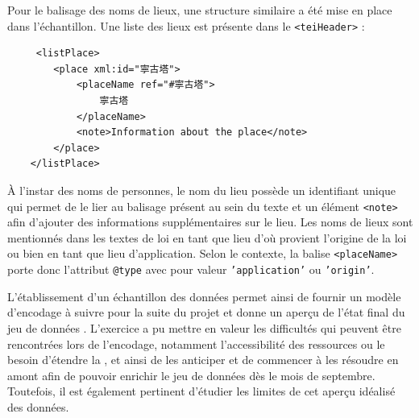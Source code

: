 Pour le balisage des noms de lieux, une structure similaire a été mise en place dans l'échantillon. Une liste des lieux est présente dans le \texttt{<teiHeader>} : 
\begin{verbatim}
     <listPlace>
        <place xml:id="寧古塔">
            <placeName ref="#寧古塔">
                寧古塔
            </placeName>
            <note>Information about the place</note>
        </place>
    </listPlace>
\end{verbatim}
À l'instar des noms de personnes, le nom du lieu possède un identifiant unique qui permet de le lier au balisage présent au sein du texte et un élément \texttt{<note>} afin d'ajouter des informations supplémentaires sur le lieu. Les noms de lieux sont mentionnés dans les textes de loi en tant que lieu d'où provient l'origine de la loi ou bien en tant que lieu d'application. Selon le contexte, la balise \texttt{<placeName>} porte donc l'attribut \texttt{@type} avec pour valeur \texttt{'application'} ou \texttt{'origin'}. 

L'établissement d'un échantillon des données permet ainsi de fournir un modèle d'encodage à suivre pour la suite du projet et donne un aperçu de l'état final du jeu de données \TEI. L'exercice a pu mettre en valeur les difficultés qui peuvent être rencontrées lors de l'encodage, notamment l'accessibilité des ressources ou le besoin d'étendre la \TEI, et ainsi de les anticiper et de commencer à les résoudre en amont afin de pouvoir enrichir le jeu de données dès le mois de septembre. Toutefois, il est également pertinent d'étudier les limites de cet aperçu idéalisé des données.

